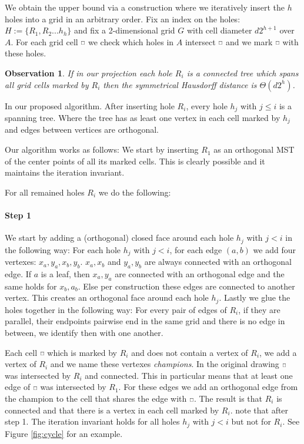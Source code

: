 \documentclass[a4paper,UKenglish,cleveref]{lipics-v2019}
\newtheorem{observation}{Observation}
\newcommand{\pix}{\scalebox{0.6}{$\square$}}
\begin{document}
We obtain the upper bound via a construction where we iteratively insert the $h$ holes into a grid in an arbitrary order.
Fix an index on the holes: $H := \{ R_1, R_2 ... h_h \}$ and fix a 2-dimensional grid $G$ with cell diameter $ d 2^{h+1}$ over $A$.
For each grid cell $\hfill\pix$ we check which holes in $A$ intersect $\hfill\pix$ and we mark $\hfill\pix$ with these holes.

\begin{observation}
If in our projection each hole $R_i$ is a connected tree which spans all grid cells marked by $R_i$ then the symmetrical Hausdorff distance is $\Theta(d2^h)$.
\end{observation}

\begin{definition}
In our proposed algorithm. After inserting hole $R_i$, every hole $h_j$ with $j \le i$ is a spanning tree. Where the tree has as least one vertex in each cell marked by $h_j$ and edges between vertices are orthogonal.
\end{definition}


Our algorithm works as follows: We start by inserting $R_1$ as an orthogonal MST of the center points of all its marked cells. This is clearly possible and it maintains the iteration invariant.



For all remained holes $R_i$ we do the following:

\paragraph*{Step 1}
We start by adding a (orthogonal) closed face around each hole $h_j$ with $j < i$ in the following way:
For each hole $h_j$ with $j < i$, for each edge $(a,b)$ we add four vertexes: $x_a, y_a, x_b, y_b$.  $x_a, x_b$ and $y_a,y_b$ are always connected with an orthogonal edge. If $a$ is a leaf, then $x_a,y_a$ are connected with an orthogonal edge and the same holds for $x_b,a_b$. Else per construction these edges are connected to another vertex. This creates an orthogonal face around each hole $h_j$.
Lastly we glue the holes together in the following way: For every pair of edges of $R_i$, if they are parallel, their endpoints pairwise end in the same grid and there is no edge in between, we identify then with one another.

Each cell $\hfill\pix$ which is marked by $R_i$ and does not contain a vertex of $R_i$, we add a vertex of $R_i$ and we name these vertexes \emph{champions}. In the original drawing $\hfill\pix$ was intersected by $R_i$ and connected. This in particular means that at least one edge of $\hfill\pix$ was intersected by $R_1$. For these edges we add an orthogonal edge from the champion to the cell that shares the edge with $\hfill\pix$. The result is that $R_i$ is connected and that there is a vertex in each cell marked by $R_i$.
note that after step 1. The iteration invariant holds for all holes $h_j$ with $j < i$ but not for $R_i$. See Figure \ref{fig:cycle} for an example.
\end{document}

